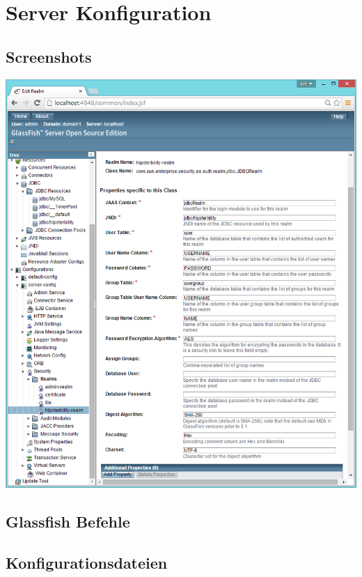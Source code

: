 \section{Server Konfiguration}
\subsection{Screenshots}
\begin{minipage}[t]{\textwidth}
	\includegraphics[width = \linewidth]{img/screenshot_realm.png}
	\label{fig:realm_screenshot}
\end{minipage}

\newpage
\subsection{Glassfish Befehle}




\subsection{Konfigurationsdateien}





